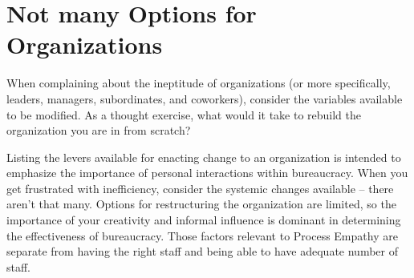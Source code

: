 \section{Not many Options for Organizations}

When complaining about the ineptitude of organizations (or more specifically, leaders, managers, subordinates, and coworkers), consider the variables available to be modified. As a thought exercise, what would it take to rebuild the organization you are in from scratch? 

Listing the levers available for enacting change to an organization is intended to emphasize the importance of personal interactions within bureaucracy. When you get frustrated with inefficiency, consider the systemic changes available -- there aren't that many. Options for restructuring the organization are limited, so the importance of your creativity and informal influence is dominant in determining the effectiveness of bureaucracy. Those factors relevant to Process Empathy are separate from having the right staff and being able to have adequate number of staff. 

